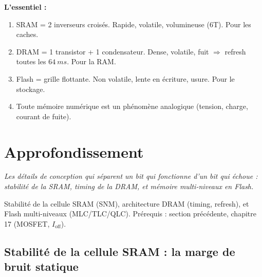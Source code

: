 \documentclass[12pt,a4paper,twoside]{book}
\begin{document}
\begin{retenir}
\textbf{L'essentiel :}
\begin{enumerate}[nosep]
\item SRAM = 2 inverseurs croisés. Rapide, volatile, volumineuse (6T). Pour les caches.
\item DRAM = 1 transistor + 1 condensateur. Dense, volatile, fuit $\Rightarrow$ refresh toutes les $\SI{64}{ms}$. Pour la RAM.
\item Flash = grille flottante. Non volatile, lente en écriture, usure. Pour le stockage.
\item Toute mémoire numérique est un phénomène analogique (tension, charge, courant de fuite).
\end{enumerate}
\end{retenir}

\section{Approfondissement}

\vspace{0.3cm}
\textit{Les détails de conception qui séparent un bit qui fonctionne d'un bit qui échoue : stabilité de la SRAM, timing de la DRAM, et mémoire multi-niveaux en Flash.}
\vspace{0.3cm}

\begin{approfondissement}
Stabilité de la cellule SRAM (SNM), architecture DRAM (timing, refresh), et Flash multi-niveaux (MLC/TLC/QLC). Prérequis : section précédente, chapitre 17 (MOSFET, $I_{\text{off}}$).
\end{approfondissement}

\subsection{Stabilité de la cellule SRAM : la marge de bruit statique}
\end{document}
